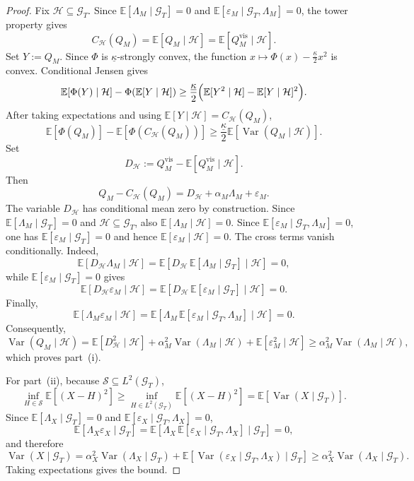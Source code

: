 \documentclass[11pt,a4paper]{amsart}
\theoremstyle{plain}
\theoremstyle{definition}
\theoremstyle{remark}
\DeclareMathOperator{\Var}{Var}
\newcommand{\EE}{\mathbb{E}}
\newcommand{\cH}{\mathcal{H}}
\newcommand{\cG}{\mathcal{G}}
\begin{document}
\begin{proof}
Fix \(\cH\subseteq\cG_T\).  Since \(\EE[\Lambda_M\mid \cG_T]=0\) and
\(\EE[\varepsilon_M\mid \cG_T,\Lambda_M]=0\), the tower property gives
\[
        C_{\cH}(Q_M)
        =
        \EE[Q_M\mid \cH]
        =
        \EE[Q_M^{\mathrm{vis}}\mid \cH].
\]
Set \(Y:=Q_M\).  Since \(\Phi\) is \(\underline\kappa\)-strongly convex, the function
\(
        x\mapsto \Phi(x)-\frac{\underline\kappa}{2}x^2
\)
is convex.  Conditional Jensen gives
\[
        \EE[\Phi(Y)\mid\cH]-\Phi(\EE[Y\mid\cH])
        \ge
        \frac{\underline\kappa}{2}
        \Bigl(\EE[Y^2\mid\cH]-\EE[Y\mid\cH]^2\Bigr).
\]
After taking expectations and using \(\EE[Y\mid\cH]=C_{\cH}(Q_M)\),
\[
        \EE[\Phi(Q_M)]-\EE[\Phi(C_{\cH}(Q_M))]
        \ge
        \frac{\underline\kappa}{2}\EE[\Var(Q_M\mid \cH)].
\]
Set
\[
        D_{\cH}:=Q_M^{\mathrm{vis}}-\EE[Q_M^{\mathrm{vis}}\mid \cH].
\]
Then
\[
        Q_M-C_{\cH}(Q_M)=D_{\cH}+\alpha_M\Lambda_M+\varepsilon_M.
\]
The variable \(D_{\cH}\) has conditional mean zero by construction.  Since
\(\EE[\Lambda_M\mid\cG_T]=0\) and \(\cH\subseteq\cG_T\), also
\(\EE[\Lambda_M\mid\cH]=0\).  Since
\(\EE[\varepsilon_M\mid\cG_T,\Lambda_M]=0\), one has \(\EE[\varepsilon_M\mid\cG_T]=0\) and hence
\(\EE[\varepsilon_M\mid\cH]=0\).  The cross terms vanish conditionally.  Indeed,
\[
        \EE[D_{\cH}\Lambda_M\mid \cH]
        =
        \EE\!\left[D_{\cH}\,\EE[\Lambda_M\mid \cG_T]\mid \cH\right]
        =0,
\]
while \(\EE[\varepsilon_M\mid\cG_T]=0\) gives
\[
        \EE[D_{\cH}\varepsilon_M\mid \cH]
        =
        \EE\!\left[D_{\cH}\,\EE[\varepsilon_M\mid \cG_T]\mid \cH\right]
        =0.
\]
Finally,
\[
        \EE[\Lambda_M\varepsilon_M\mid \cH]
        =
        \EE\!\left[\Lambda_M\,\EE[\varepsilon_M\mid \cG_T,\Lambda_M]\mid \cH\right]
        =0.
\]
Consequently,
\[
        \Var(Q_M\mid \cH)
        =
        \EE[D_{\cH}^2\mid \cH]
        +
        \alpha_M^2\Var(\Lambda_M\mid \cH)
        +
        \EE[\varepsilon_M^2\mid \cH]
        \ge
        \alpha_M^2\Var(\Lambda_M\mid \cH),
\]
which proves part~(i).

For part~(ii), because \(\mathcal S\subseteq L^2(\cG_T)\),
\[
        \inf_{H\in\mathcal S}\EE[(X-H)^2]
        \ge
        \inf_{H\in L^2(\cG_T)}\EE[(X-H)^2]
        =
        \EE[\Var(X\mid \cG_T)].
\]
Since \(\EE[\Lambda_X\mid\cG_T]=0\) and
\(\EE[\varepsilon_X\mid\cG_T,\Lambda_X]=0\),
\[
        \EE[\Lambda_X\varepsilon_X\mid\cG_T]
        =
        \EE\!\left[\Lambda_X\,\EE[\varepsilon_X\mid \cG_T,\Lambda_X]\mid \cG_T\right]
        =
        0,
\]
and therefore
\[
        \Var(X\mid\cG_T)
        =
        \alpha_X^2\Var(\Lambda_X\mid\cG_T)
        +
        \EE[\Var(\varepsilon_X\mid\cG_T,\Lambda_X)\mid \cG_T]
        \ge
        \alpha_X^2\Var(\Lambda_X\mid\cG_T).
\]
Taking expectations gives the bound.
\end{proof}
\end{document}
